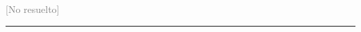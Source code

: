 \begin{ejercicio}
\begin{figure}[ht]
\begin{tikzpicture}
    \end{tikzpicture}
    \caption{}
    \label{fig:edcmat-triangulo1}
  \end{figure}

  \vspace{-3ex}
  {\footnotesize \textcolor{gray}{[No resuelto]}}
  \medskip
  {\color{gray}
    \hrule
  }
  

\end{ejercicio}
